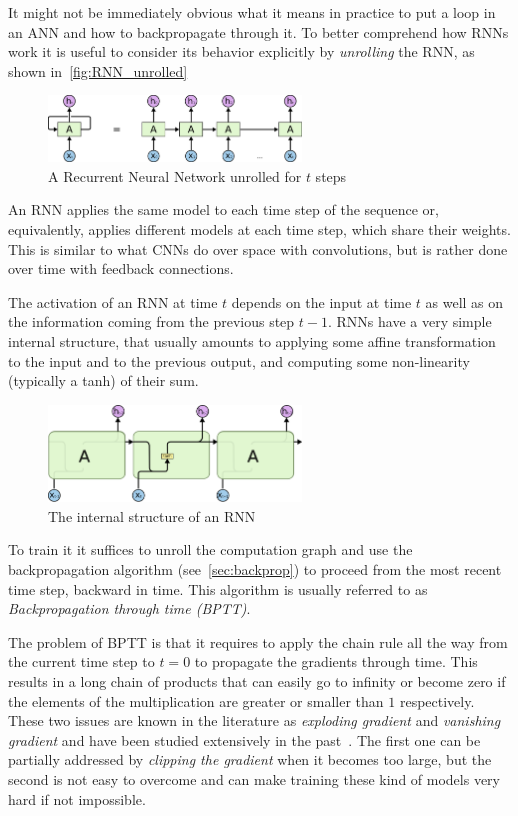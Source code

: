 It might not be immediately obvious what it means in practice to put a loop in
an ANN and how to backpropagate through it. To better comprehend how RNNs work
it is useful to consider its behavior explicitly by \emph{unrolling} the RNN,
as shown in~\autoref{fig:RNN_unrolled}

\begin{figure}[h]
    \centering
    \includegraphics[width=0.6\textwidth]{pdf/RNN_unrolled.pdf}
    \caption{A Recurrent Neural Network unrolled for $t$%
             steps\label{fig:RNN_unrolled}}
\end{figure}

\noindent An RNN applies the same model to each time step of the sequence or,
equivalently, applies different models at each time step, which share their
weights. This is similar to what CNNs do over space with convolutions, but is
rather done over time with feedback connections.

The activation of an RNN at time $t$ depends on the input at time $t$ as well
as on the information coming from the previous step $t-1$. RNNs have a very
simple internal structure, that usually amounts to applying some affine
transformation to the input and to the previous output, and computing some
non-linearity (typically a tanh) of their sum.

\begin{figure}[h]
    \centering
    \includegraphics[width=0.6\textwidth]{pdf/RNN_internals.pdf}
    \caption{The internal structure of an RNN\label{fig:RNN_internals}}
\end{figure}

To train it it suffices to unroll the computation graph and use the
backpropagation algorithm (see~\autoref{sec:backprop}) to proceed from the most
recent time step, backward in time. This algorithm is usually referred to as
\emph{Backpropagation through time (BPTT)}.

The problem of BPTT is that it requires to apply the chain rule all the way
from the current time step to $t = 0$ to propagate the gradients through time.
This results in a long chain of products that can easily go to infinity or
become zero if the elements of the multiplication are greater or smaller than
$1$ respectively. These two issues are known in the literature as
\emph{exploding gradient} and \emph{vanishing gradient} and have been studied
extensively in the past~\citep[see e.g., ][]{Hochreiter91,Bengio-trnn93}. The first one
can be partially addressed by \emph{clipping the gradient} when it becomes too
large, but the second is not easy to overcome and can make training these kind
of models very hard if not impossible.

